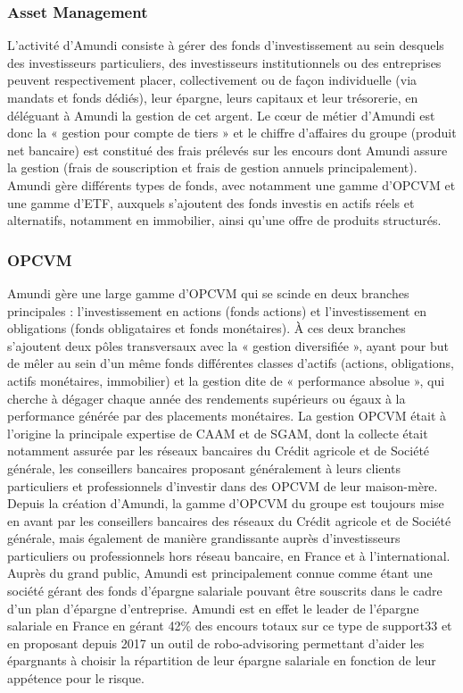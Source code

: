 \subsubsection{Asset Management}
\par L'activité d'Amundi consiste à gérer des fonds d'investissement au sein desquels des investisseurs particuliers, des investisseurs institutionnels ou des entreprises peuvent respectivement placer, collectivement ou de façon individuelle (via mandats et fonds dédiés), leur épargne, leurs capitaux et leur trésorerie, en déléguant à Amundi la gestion de cet argent. Le cœur de métier d'Amundi est donc la « gestion pour compte de tiers » et le chiffre d'affaires du groupe (produit net bancaire) est constitué des frais prélevés sur les encours dont Amundi assure la gestion (frais de souscription et frais de gestion annuels principalement). Amundi gère différents types de fonds, avec notamment une gamme d'OPCVM et une gamme d'ETF, auxquels s'ajoutent des fonds investis en actifs réels et alternatifs, notamment en immobilier, ainsi qu'une offre de produits structurés.
\subsubsection{OPCVM}
Amundi gère une large gamme d'OPCVM qui se scinde en deux branches principales : l'investissement en actions (fonds actions) et l'investissement en obligations (fonds obligataires et fonds monétaires). À ces deux branches s'ajoutent deux pôles transversaux avec la « gestion diversifiée », ayant pour but de mêler au sein d'un même fonds différentes classes d'actifs (actions, obligations, actifs monétaires, immobilier) et la gestion dite de « performance absolue », qui cherche à dégager chaque année des rendements supérieurs ou égaux à la performance générée par des placements monétaires. La gestion OPCVM était à l'origine la principale expertise de CAAM et de SGAM, dont la collecte était notamment assurée par les réseaux bancaires du Crédit agricole et de Société générale, les conseillers bancaires proposant généralement à leurs clients particuliers et professionnels d'investir dans des OPCVM de leur maison-mère. Depuis la création d'Amundi, la gamme d'OPCVM du groupe est toujours mise en avant par les conseillers bancaires des réseaux du Crédit agricole et de Société générale, mais également de manière grandissante auprès d'investisseurs particuliers ou professionnels hors réseau bancaire, en France et à l'international. Auprès du grand public, Amundi est principalement connue comme étant une société gérant des fonds d'épargne salariale pouvant être souscrits dans le cadre d'un plan d'épargne d'entreprise. Amundi est en effet le leader de l'épargne salariale en France en gérant 42\% des encours totaux sur ce type de support33 et en proposant depuis 2017 un outil de robo-advisoring permettant d'aider les épargnants à choisir la répartition de leur épargne salariale en fonction de leur appétence pour le risque.
